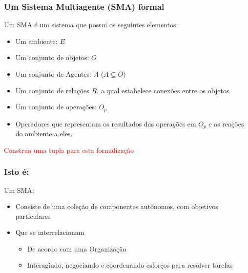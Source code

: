 


\begin{frame} %

\frametitle{Um Sistema Multiagente (SMA) formal}

\begin{block}{Um SMA é um sistema que possui os seguintes elementos:}
  \begin{itemize}
    \item Um ambiente: $E$
    \item Um conjunto de objetos: $O$
    \item Um conjunto de Agentes: $A$ ($A\subseteq O$)
    \item Um conjunto de relações $R$, a qual estabelece
    conexões entre os objetos
    \item Um conjunto de operações: $O_p$
    \item Operadores que representam os resultados das operações em $O_p$
     e as reações do ambiente a eles.
       
  \end{itemize}
   
\end{block}

\textcolor{red}{Construa uma tupla para esta formalização}


\end{frame}



\begin{frame} %

\frametitle{Isto é:}

\begin{block}{Um SMA:}
  \begin{itemize}

   \item Consiste de uma coleção de componentes autônomos, com objetivos particulares
    \item Que se interrelacionam

\begin{itemize}
  \item De acordo com uma Organização
  \item Interagindo, negociando  e coordenando esforços para resolver tarefas 
  \end{itemize}  
  \end{itemize}
   
\end{block}

\end{frame}

